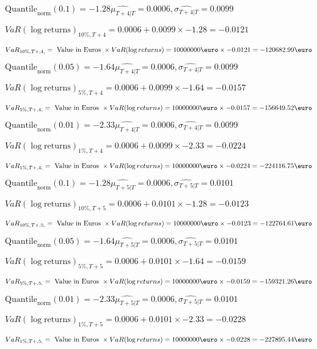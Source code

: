 $\text{Quantile}_\text{norm}(0.1) = -1.28$$\hat{\mu_{T+4|T}} = 0.0006, \hat{\sigma_{T+4|T}} = 0.0099$

$VaR(\log \text{returns})_{10\%, T + 4} = 0.0006 + 0.0099\times-1.28 = -0.0121$

$VaR_{10\%, T + ,4,} = \text{ Value in Euros } \times VaR(\log returns) = 10 000 000 \text{\euro} \times-0.0121 = -120682.99 \text{\euro}$


$\text{Quantile}_\text{norm}(0.05) = -1.64$$\hat{\mu_{T+4|T}} = 0.0006, \hat{\sigma_{T+4|T}} = 0.0099$

$VaR(\log \text{returns})_{5\%, T + 4} = 0.0006 + 0.0099\times-1.64 = -0.0157$

$VaR_{5\%, T + ,4,} = \text{ Value in Euros } \times VaR(\log returns) = 10 000 000 \text{\euro} \times-0.0157 = -156649.52 \text{\euro}$


$\text{Quantile}_\text{norm}(0.01) = -2.33$$\hat{\mu_{T+4|T}} = 0.0006, \hat{\sigma_{T+4|T}} = 0.0099$

$VaR(\log \text{returns})_{1\%, T + 4} = 0.0006 + 0.0099\times-2.33 = -0.0224$

$VaR_{1\%, T + ,4,} = \text{ Value in Euros } \times VaR(\log returns) = 10 000 000 \text{\euro} \times-0.0224 = -224116.75 \text{\euro}$


$\text{Quantile}_\text{norm}(0.1) = -1.28$$\hat{\mu_{T+5|T}} = 0.0006, \hat{\sigma_{T+5|T}} = 0.0101$

$VaR(\log \text{returns})_{10\%, T + 5} = 0.0006 + 0.0101\times-1.28 = -0.0123$

$VaR_{10\%, T + ,5,} = \text{ Value in Euros } \times VaR(\log returns) = 10 000 000 \text{\euro} \times-0.0123 = -122764.61 \text{\euro}$


$\text{Quantile}_\text{norm}(0.05) = -1.64$$\hat{\mu_{T+5|T}} = 0.0006, \hat{\sigma_{T+5|T}} = 0.0101$

$VaR(\log \text{returns})_{5\%, T + 5} = 0.0006 + 0.0101\times-1.64 = -0.0159$

$VaR_{5\%, T + ,5,} = \text{ Value in Euros } \times VaR(\log returns) = 10 000 000 \text{\euro} \times-0.0159 = -159321.26 \text{\euro}$


$\text{Quantile}_\text{norm}(0.01) = -2.33$$\hat{\mu_{T+5|T}} = 0.0006, \hat{\sigma_{T+5|T}} = 0.0101$

$VaR(\log \text{returns})_{1\%, T + 5} = 0.0006 + 0.0101\times-2.33 = -0.0228$

$VaR_{1\%, T + ,5,} = \text{ Value in Euros } \times VaR(\log returns) = 10 000 000 \text{\euro} \times-0.0228 = -227895.44 \text{\euro}$


